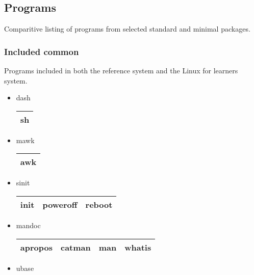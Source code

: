 \subsection{Programs}\label{Programs}

Comparitive listing of programs from selected standard and minimal packages.

\subsubsection{Included common}

Programs included in both the reference system and the Linux for learners system.

\begin{itemize}
    \item dash
        \begin{center}
            \begin{tabular}{|c|}
                \hline
                sh \\
                \hline
            \end{tabular}
        \end{center}
    \item mawk
        \begin{center}
            \begin{tabular}{|c|}
                \hline   
                awk \\
                \hline
            \end{tabular}
        \end{center}
    \item sinit
        \begin{center}
            \begin{tabular}{|c|c|c|}
                \hline
                init & poweroff & reboot \\
                \hline
            \end{tabular}
        \end{center}
    \item mandoc
        \begin{center}
            \begin{tabular}{|c|c|c|c|}
                \hline
                apropos & catman & man & whatis \\
                \hline
            \end{tabular}
        \end{center}
    \item ubase
        \begin{center}

\end{center}
\end{itemize}
